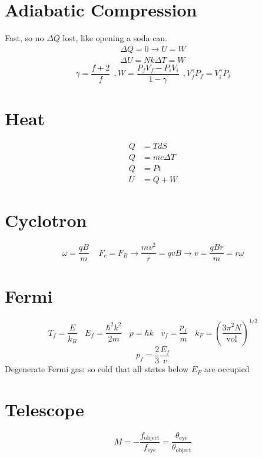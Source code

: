 \documentclass[10pt,a4paper]{article}
\begin{document}
\section{Adiabatic Compression} %
\label{sec:adiabatic_compression}
Fast, so no $\Delta Q$ lost, like opening a soda can.
\begin{align}
    \Delta Q = 0 \rightarrow U = W\\
    \Delta U = Nk \Delta T = W
\end{align}
\begin{equation}
    \gamma = \frac{f+2}{f}~~, W = \frac{P_fV_f - P_iV_i}{1-\gamma}~~,V_f^\gamma P_f = V_i^\gamma P_i
\end{equation}

\section{Heat} %
\label{sec:heat}
\begin{align}
Q &= TdS\\
Q &= mc \Delta T\\
Q &= Pt\\
U &= Q + W
\end{align}

\section{Cyclotron} %
\label{sec:cyclotron}
\begin{equation}
    \omega = \frac{qB}{m} ~~~~~ F_c = F_B \rightarrow \frac{mv^2}{r} = qvB \rightarrow v = \frac{qBr}{m} = r\omega
\end{equation}

\section{Fermi} %
\label{sec:fermi}
\begin{equation}
    T_f = \frac{E}{k_B}~~~~E_f = \frac{\hbar^2 k^2}{2m} ~~~~ p = \hbar k~~~~ v_f = \frac{p_f}{m}~~~~k_F = \left( \frac{3\pi^2N}{\textrm{vol}} \right) ^{1/3}
\end{equation}
\begin{equation}
    p_f = \frac{2}{3}\frac{E_f}{v}
\end{equation}
Degenerate Fermi gas: so cold that all states below $E_F$ are occupied

\section{Telescope} %
\label{sec:telescope}
\begin{equation}
    M = -\frac{f_\textrm{object}}{f_\textrm{eye}} = \frac{\theta_{\textrm{eye}}}{\theta_{\textrm{object}}}
\end{equation}
\end{document}
